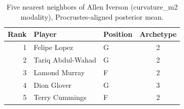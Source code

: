 \begin{table}[htbp]
  \centering\small
  \begin{tabular}{rllc}
    \toprule
    Rank & Player & Position & Archetype \\
    \midrule
    1 & Felipe Lopez & G & 2 \\
    2 & Tariq Abdul-Wahad & G & 2 \\
    3 & Lamond Murray & F & 2 \\
    4 & Dion Glover & G & 3 \\
    5 & Terry Cummings & F & 2 \\
    \bottomrule
  \end{tabular}
  \caption{Five nearest neighbors of Allen Iverson (curvature_m2 modality), Procrustes-aligned posterior mean.}
  \label{tab:Allen_Iverson_neighbors_curvature_m2}
\end{table}

